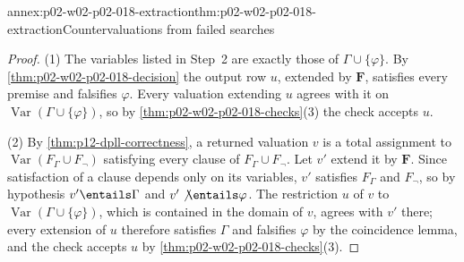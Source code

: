 \begin{annexitem}{annex:p02-w02-p02-018-extraction}{thm:p02-w02-p02-018-extraction}{Countervaluations from failed searches}
\begin{proof}
(1) The variables listed in Step~2 are exactly those of
\(\Gamma\cup\{\varphi\}\).  By \cref{thm:p02-w02-p02-018-decision} the output
row \(u\), extended by \(\mathbf F\), satisfies every premise and falsifies
\(\varphi\).  Every valuation extending \(u\) agrees with it on
\(\operatorname{Var}(\Gamma\cup\{\varphi\})\), so by
\cref{thm:p02-w02-p02-018-checks}(3) the check accepts \(u\).

(2) By \cref{thm:p12-dpll-correctness}, a returned valuation \(v\) is a total
assignment to \(\operatorname{Var}(F_\Gamma\cup F_\neg)\) satisfying every
clause of \(F_\Gamma\cup F_\neg\).  Let \(v'\) extend it by \(\mathbf F\).
Since satisfaction of a clause depends only on its variables, \(v'\) satisfies
\(F_\Gamma\) and \(F_\neg\), so by hypothesis \(v'\entails\Gamma\) and
\(v'\not\entails\varphi\).  The restriction \(u\) of \(v\) to
\(\operatorname{Var}(\Gamma\cup\{\varphi\})\), which is contained in the
domain of \(v\), agrees with \(v'\) there; every extension of \(u\) therefore
satisfies \(\Gamma\) and falsifies \(\varphi\) by the coincidence lemma, and
the check accepts \(u\) by \cref{thm:p02-w02-p02-018-checks}(3).
\end{proof}
\end{annexitem}

